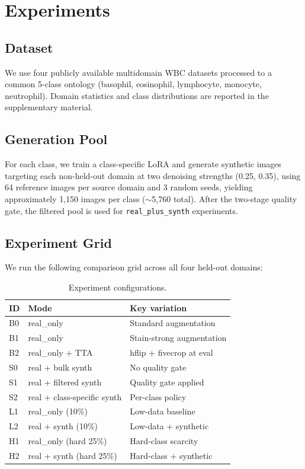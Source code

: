 \documentclass[10pt,twocolumn]{article}
\begin{document}
\section{Experiments}
\label{sec:experiments}

\subsection{Dataset}

We use four publicly available multidomain WBC datasets processed to a
common 5-class ontology (basophil, eosinophil, lymphocyte, monocyte,
neutrophil). Domain statistics and class distributions are reported in
the supplementary material.

\subsection{Generation Pool}

For each class, we train a class-specific LoRA and generate synthetic
images targeting each non-held-out domain at two denoising strengths
(0.25, 0.35), using 64 reference images per source domain and 3 random
seeds, yielding approximately 1{,}150 images per class ($\sim$5{,}760
total). After the two-stage quality gate, the filtered pool is used for
\texttt{real\_plus\_synth} experiments.

\subsection{Experiment Grid}

We run the following comparison grid across all four held-out domains:

\begin{table}[H]
\centering
\small
\caption{Experiment configurations.}
\label{tab:experiment-grid}
\begin{tabular}{lll}
\toprule
ID & Mode & Key variation \\
\midrule
B0 & real\_only & Standard augmentation \\
B1 & real\_only & Stain-strong augmentation \\
B2 & real\_only + TTA & hflip + fivecrop at eval \\
S0 & real + bulk synth & No quality gate \\
S1 & real + filtered synth & Quality gate applied \\
S2 & real + class-specific synth & Per-class policy \\
L1 & real\_only (10\%) & Low-data baseline \\
L2 & real + synth (10\%) & Low-data + synthetic \\
H1 & real\_only (hard 25\%) & Hard-class scarcity \\
H2 & real + synth (hard 25\%) & Hard-class + synthetic \\
\bottomrule
\end{tabular}
\end{table}
\end{document}
